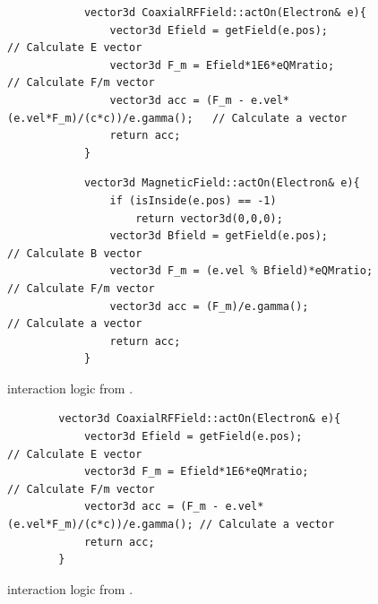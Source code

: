 \documentclass[a4paper,oneside,12pt]{report}
\numberwithin{equation}{chapter}
\begin{document}
\begin{figure}[H]
    \begin{minipage}{\textwidth}
        \begin{verbatim}
            vector3d CoaxialRFField::actOn(Electron& e){
                vector3d Efield = getField(e.pos);                          // Calculate E vector
                vector3d F_m = Efield*1E6*eQMratio;                         // Calculate F/m vector
                vector3d acc = (F_m - e.vel*(e.vel*F_m)/(c*c))/e.gamma();   // Calculate a vector
                return acc;
            }
        \end{verbatim}
    \end{minipage}

    \begin{minipage}{\textwidth}
        \begin{verbatim}
            vector3d MagneticField::actOn(Electron& e){
                if (isInside(e.pos) == -1)
                    return vector3d(0,0,0);
                vector3d Bfield = getField(e.pos);                          // Calculate B vector
                vector3d F_m = (e.vel % Bfield)*eQMratio;                   // Calculate F/m vector
                vector3d acc = (F_m)/e.gamma();                             // Calculate a vector
                return acc;
            }
        \end{verbatim}
    \end{minipage}
    \vspace{20pt}
    \caption{\eEM  interaction logic from .}
    \label{fig:3D_e_EM_interaction_first}
\end{figure}\fi
\begin{figure}[H]
    \begin{verbatim}
        vector3d CoaxialRFField::actOn(Electron& e){
            vector3d Efield = getField(e.pos);                        // Calculate E vector
            vector3d F_m = Efield*1E6*eQMratio;                       // Calculate F/m vector
            vector3d acc = (F_m - e.vel*(e.vel*F_m)/(c*c))/e.gamma(); // Calculate a vector
            return acc;
        }
    \end{verbatim}
    \vspace{20pt}
    \caption{\eE interaction logic from .}
    \label{fig:3D_e_E_interaction_first}
\end{figure}
\end{document}
